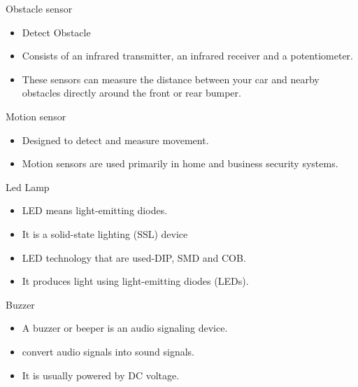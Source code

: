 \documentclass[10pt]{beamer}
\begin{document}
\begin{frame}{Obstacle sensor}

\begin{itemize}
    \item Detect Obstacle
\item Consists of an infrared
transmitter, an infrared receiver
and a potentiometer.
\item These sensors can measure the
distance between your car and
nearby obstacles directly around
the front or rear bumper.
\end{itemize}
    
\end{frame}
\begin{frame}{Motion sensor}
    \begin{itemize}
        \item Designed to detect and
measure movement.
\item Motion sensors are used
primarily in home and
business security systems.
    \end{itemize}
\end{frame}
\begin{frame}{Led Lamp}
\begin{itemize}
    \item LED means light-emitting
diodes.
\item It is a solid-state lighting
(SSL) device
\item LED technology that are
used-DIP, SMD and COB.
\item It produces
light using light-emitting
diodes (LEDs).
\end{itemize}
    
\end{frame}
\begin{frame}{Buzzer}
\begin{itemize}
    \item A buzzer or beeper is
an audio signaling
device.
\item convert audio
signals into sound
signals.
\item It is usually powered
by DC voltage.
\end{itemize}
    
\end{frame}
\end{document}
